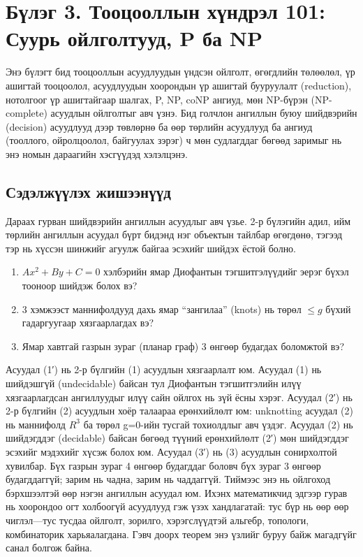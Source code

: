\chapter{Бүлэг 3. Тооцооллын хүндрэл 101: Суурь ойлголтууд, P ба NP}
\label{chap:regular}

Энэ бүлэгт бид тооцооллын асуудлуудын үндсэн ойлголт, өгөгдлийн төлөөлөл, үр ашигтай тооцоолол, асуудлуудын хоорондын үр ашигтай бууруулалт (reduction), нотолгоог үр ашигтайгаар шалгах, P, NP, coNP ангиуд, мөн NP-бүрэн (NP-complete) асуудлын ойлголтыг авч үзнэ. Бид голчлон ангиллын буюу шийдвэрийн (decision) асуудлууд дээр төвлөрнө ба өөр төрлийн асуудлууд ба ангиуд (тооллого, ойролцоолол, байгуулах зэрэг) ч мөн судлагддаг бөгөөд заримыг нь энэ номын дараагийн хэсгүүдэд хэлэлцэнэ.

\section{Сэдэлжүүлэх жишээнүүд}
Дараах гурван шийдвэрийн ангиллын асуудлыг авч үзье. 2-р бүлэгийн адил, ийм төрлийн ангиллын асуудал бүрт бидэнд нэг объектын тайлбар өгөгдөнө, тэгээд тэр нь хүссэн шинжийг агуулж байгаа эсэхийг шийдэх ёстой болно.

\begin{enumerate}
  \item $Ax^2+By+C=0$ хэлбэрийн ямар Диофантын тэгшитгэлүүдийг эерэг бүхэл тооноор шийдэж болох вэ?
  \item 3 хэмжээст маннифолдууд дахь ямар “зангилаа” (knots) нь төрөл $\le g$ бүхий гадаргуугаар хязгаарлагдах вэ?
  \item Ямар хавтгай газрын зураг (планар граф) 3 өнгөөр будагдах боломжтой вэ?
\end{enumerate}

Асуудал (1′) нь 2-р бүлгийн (1) асуудлын хязгаарлалт юм. Асуудал (1) нь шийдэшгүй (undecidable) байсан тул Диофантын тэгшитгэлийн илүү хязгаарлагдсан ангиллуудыг илүү сайн ойлгох нь зүй ёсны хэрэг. Асуудал (2′) нь 2-р бүлгийн (2) асуудлын хоёр талаараа ерөнхийлөлт юм: unknotting асуудал (2) нь маннифолд $R^3$ ба төрөл g=0-ийн тусгай тохиолдлыг авч үздэг. Асуудал (2) нь шийдэгддэг (decidable) байсан бөгөөд түүний ерөнхийлөлт (2′) мөн шийдэгддэг эсэхийг мэдэхийг хүсэж болох юм. Асуудал (3′) нь (3) асуудлын сонирхолтой хувилбар. Бүх газрын зураг 4 өнгөөр будагддаг боловч бүх зураг 3 өнгөөр будагддаггүй; зарим нь чадна, зарим нь чаддаггүй. Тиймээс энэ нь ойлгоход бэрхшээлтэй өөр нэгэн ангиллын асуудал юм.
Ихэнх математикчид эдгээр гурав нь хоорондоо огт холбоогүй асуудлууд гэж үзэх хандлагатай: тус бүр нь өөр өөр чиглэл—тус тусдаа ойлголт, зорилго, хэрэгслүүдтэй альгебр, топологи, комбинаторик харьяалагдана. Гэвч доорх теорем энэ үзлийг буруу байж магадгүйг санал болгож байна.


